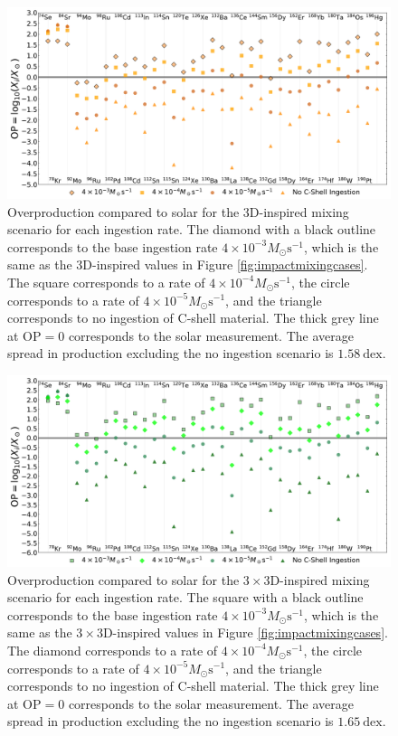 \begin{figure}[!htbp]
\includegraphics[width=\textwidth]{chapters/2/figures/ingest_3D.pdf}
\caption{Overproduction compared to solar for the 3D-inspired mixing scenario for each ingestion rate. The diamond with a black outline corresponds to the base ingestion rate $4\times10^{-3}M_\odot\mathrm{s^{-1}}$, which is the same as the 3D-inspired values in Figure \ref{fig:impactmixingcases}. The square corresponds to a rate of $4\times10^{-4}M_\odot\mathrm{s^{-1}}$, the circle corresponds to a rate of $4\times10^{-5}M_\odot\mathrm{s^{-1}}$, and the triangle corresponds to no ingestion of C-shell material. The thick grey line at $\mathrm{OP}=0$ corresponds to the solar measurement. The average spread in production excluding the no ingestion scenario is $1.58~\mathrm{dex}$.
\label{fig:ingest_3D}}
\end{figure} 

\begin{figure}[!htbp]
\includegraphics[width=\textwidth]{chapters/2/figures/ingest_3x3D.pdf}
\caption{Overproduction compared to solar for the $3\times$3D-inspired mixing scenario for each ingestion rate. The square with a black outline corresponds to the base ingestion rate $4\times10^{-3}M_\odot\mathrm{s^{-1}}$, which is the same as the $3\times$3D-inspired values in Figure \ref{fig:impactmixingcases}. The diamond corresponds to a rate of $4\times10^{-4}M_\odot\mathrm{s^{-1}}$, the circle corresponds to a rate of $4\times10^{-5}M_\odot\mathrm{s^{-1}}$, and the triangle corresponds to no ingestion of C-shell material. The thick grey line at $\mathrm{OP}=0$ corresponds to the solar measurement. The average spread in production excluding the no ingestion scenario is $1.65~\mathrm{dex}$.
\label{fig:ingest_3x3D}}
\end{figure}

